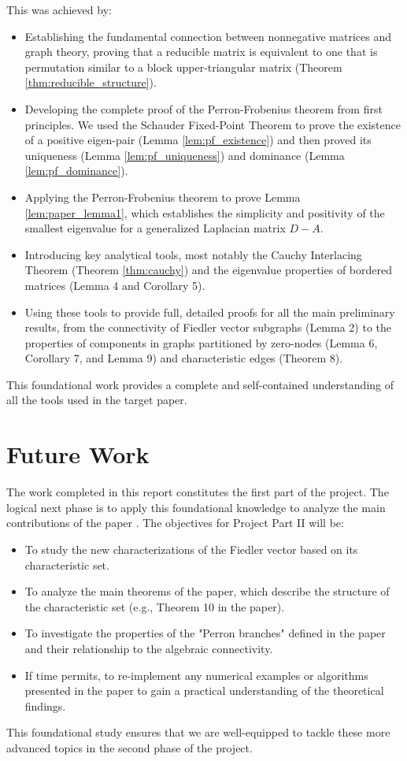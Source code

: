 \documentclass[12pt,a4paper]{report}
\theoremstyle{plain}
\theoremstyle{definition}
\theoremstyle{remark}
\begin{document}
This was achieved by:
\begin{itemize}
    \item Establishing the fundamental connection between nonnegative matrices and graph theory, proving that a reducible matrix is equivalent to one that is permutation similar to a block upper-triangular matrix (Theorem \ref{thm:reducible_structure}).
    
    \item Developing the complete proof of the Perron-Frobenius theorem from first principles. We used the Schauder Fixed-Point Theorem to prove the existence of a positive eigen-pair (Lemma \ref{lem:pf_existence}) and then proved its uniqueness (Lemma \ref{lem:pf_uniqueness}) and dominance (Lemma \ref{lem:pf_dominance}).
    
    \item Applying the Perron-Frobenius theorem to prove Lemma \ref{lem:paper_lemma1}, which establishes the simplicity and positivity of the smallest eigenvalue for a generalized Laplacian matrix $D-A$.
    
    \item Introducing key analytical tools, most notably the Cauchy Interlacing Theorem (Theorem \ref{thm:cauchy}) and the eigenvalue properties of bordered matrices (Lemma 4 and Corollary 5).
    
    \item Using these tools to provide full, detailed proofs for all the main preliminary results, from the connectivity of Fiedler vector subgraphs (Lemma 2) to the properties of components in graphs partitioned by zero-nodes (Lemma 6, Corollary 7, and Lemma 9) and characteristic edges (Theorem 8).
\end{itemize}
This foundational work provides a complete and self-contained understanding of all the tools used in the target paper.

\section{Future Work}
The work completed in this report constitutes the first part of the project. The logical next phase is to apply this foundational knowledge to analyze the main contributions of the paper \cite{main_paper}. The objectives for Project Part II will be:
\begin{itemize}
    \item To study the new characterizations of the Fiedler vector based on its characteristic set.
    \item To analyze the main theorems of the paper, which describe the structure of the characteristic set (e.g., Theorem 10 in the paper).
    \item To investigate the properties of the "Perron branches" defined in the paper and their relationship to the algebraic connectivity.
    \item If time permits, to re-implement any numerical examples or algorithms presented in the paper to gain a practical understanding of the theoretical findings.
\end{itemize}
This foundational study ensures that we are well-equipped to tackle these more advanced topics in the second phase of the project.




\end{document}
